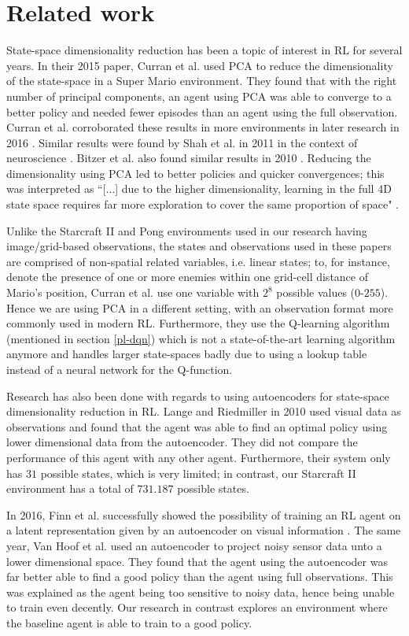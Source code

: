 \chapter{Related work}\label{relatedwork}
State-space dimensionality reduction has been a topic of interest in RL for several years. In their 2015 paper, Curran et al. \cite{mario} used PCA to reduce the dimensionality of the state-space in a Super Mario environment. They found that with the right number of principal components, an agent using PCA was able to converge to a better policy and needed fewer episodes than an agent using the full observation. Curran et al. corroborated these results in more environments in later research in 2016 \cite{pca_curran}. Similar results were found by Shah et al. in 2011 in the context of neuroscience \cite{pca_neural}. Bitzer et al. also found similar results in 2010 \cite{pca_bitzer}. Reducing the dimensionality using PCA led to better policies and quicker convergences; this was interpreted as ``[...] due to the higher dimensionality, learning in the full 4D state space requires far more exploration to cover the same proportion of space" \cite{pca_bitzer}.

Unlike the Starcraft II and Pong environments used in our research having image/grid-based observations, the states and observations used in these papers are comprised of non-spatial related variables, i.e. linear states; to, for instance, denote the presence of one or more enemies within one grid-cell distance of Mario's position, Curran et al. use one variable with $2^8$ possible values ($0$-$255$). Hence we are using PCA in a different setting, with an observation format more commonly used in modern RL. Furthermore, they use the Q-learning algorithm (mentioned in section \ref{pl-dqn}) which is not a state-of-the-art learning algorithm anymore and handles larger state-spaces badly due to using a lookup table instead of a neural network for the Q-function.

Research has also been done with regards to using autoencoders for state-space dimensionality reduction in RL. Lange and Riedmiller in 2010 \cite{AE_2010} used visual data as observations and found that the agent was able to find an optimal policy using lower dimensional data from the autoencoder. They did not compare the performance of this agent with any other agent. Furthermore, their system only has $31$ possible states, which is very limited; in contrast, our Starcraft II environment has a total of $731.187$ possible states. 

In 2016, Finn et al. successfully showed the possibility of training an RL agent on a latent representation given by an autoencoder on visual information \cite{ae_visual}. The same year, Van Hoof et al. \cite{AE_2016} used an autoencoder to project noisy sensor data unto a lower dimensional space. They found that the agent using the autoencoder was far better able to find a good policy than the agent using full observations. This was explained as the agent being too sensitive to noisy data, hence being unable to train even decently. Our research in contrast explores an environment where the baseline agent is able to train to a good policy.

